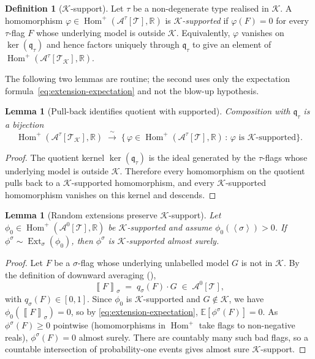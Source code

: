 \documentclass[11pt]{article}
\newtheorem{lemma}[theorem]{Lemma}
\theoremstyle{definition}
\newtheorem{definition}[theorem]{Definition}
\newcommand{\R}{\mathbb{R}}
\newcommand{\E}{\mathbb{E}}
\newcommand{\A}{\mathcal{A}}
\newcommand{\K}{\mathcal{K}}
\newcommand{\T}{\mathcal{T}}
\newcommand{\Homp}{\operatorname{Hom}^{+}}
\newcommand{\Ext}{\operatorname{Ext}}
\newcommand{\brak}[1]{\left\langle #1\right\rangle}
\newcommand{\avg}[2]{\left\llbracket #1 \right\rrbracket_{#2}}
\newcommand{\q}{\mathfrak{q}}
\begin{document}
\begin{definition}[$\K$-support]\label{def:K-support}
Let $\tau$ be a non-degenerate type realised in $\K$.  A homomorphism
$\varphi\in\Homp(\A^\tau[\T],\R)$ is \emph{$\K$-supported} if
$\varphi(F)=0$ for every $\tau$-flag $F$ whose underlying model is
outside $\K$.  Equivalently, $\varphi$ vanishes on $\ker(\q_\tau)$ and
hence factors uniquely through $\q_\tau$ to give an element of
$\Homp(\A^\tau[\T_\K],\R)$.
\end{definition}

The following two lemmas are routine; the second uses only the
expectation formula~\eqref{eq:extension-expectation} and not the
blow-up hypothesis.

\begin{lemma}[Pull-back identifies quotient with supported]\label{lem:quotient-support}
Composition with $\q_\tau$ is a bijection
\[
  \Homp(\A^\tau[\T_\K],\R)\;\xrightarrow{\;\sim\;}\;
  \bigl\{\,\varphi\in\Homp(\A^\tau[\T],\R)\,:\,\varphi\text{ is }\K\text{-supported}\bigr\}.
\]
\end{lemma}

\begin{proof}
The quotient kernel $\ker(\q_\tau)$ is the ideal generated by the
$\tau$-flags whose underlying model is outside $\K$.  Therefore every
homomorphism on the quotient pulls back to a $\K$-supported homomorphism,
and every $\K$-supported homomorphism vanishes on this kernel and
descends.
\end{proof}

\begin{lemma}[Random extensions preserve $\K$-support]\label{lem:support-passes}
Let $\phi_0\in\Homp(\A^0[\T],\R)$ be $\K$-supported and assume
$\phi_0(\brak\sigma)>0$.  If $\phi^\sigma\sim\Ext_\sigma(\phi_0)$, then
$\phi^\sigma$ is $\K$-supported almost surely.
\end{lemma}

\begin{proof}
Let $F$ be a $\sigma$-flag whose underlying unlabelled model $G$ is not
in $\K$.  By the definition of downward averaging
(\cite[\S2.2]{Razborov2007}),
\[
  \avg F \sigma \;=\; q_\sigma(F)\cdot G \;\in\; \A^0[\T],
\]
with $q_\sigma(F)\in[0,1]$.  Since $\phi_0$ is $\K$-supported and
$G\notin\K$, we have $\phi_0(\avg F\sigma)=0$, so by
\eqref{eq:extension-expectation},
\(
  \E[\phi^\sigma(F)]=0.
\)
As $\phi^\sigma(F)\ge 0$ pointwise (homomorphisms in $\Homp$ take flags
to non-negative reals), $\phi^\sigma(F)=0$ almost surely.  There are
countably many such bad flags, so a countable intersection of
probability-one events gives almost sure $\K$-support.
\end{proof}
\end{document}
